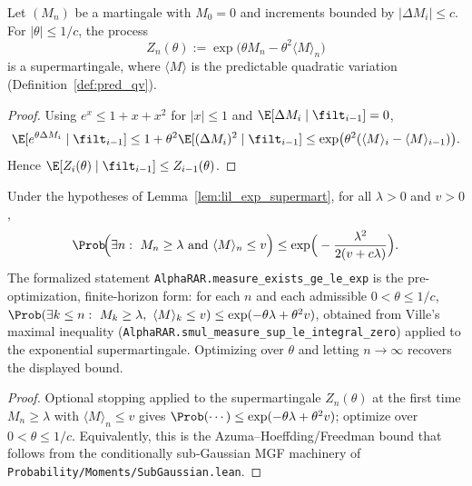 \begin{lemma}\label{lem:lil_exp_supermart}
\leanok
Let $(M_n)$ be a martingale with $M_0=0$ and increments bounded by
$|\Delta M_i| \le c$. For $|\theta| \le 1/c$, the process
\[
  Z_n(\theta) := \exp\!\Big(\theta M_n - \theta^2 \langle M\rangle_n\Big)
\]
is a supermartingale, where $\langle M\rangle$ is the predictable quadratic
variation (Definition~\ref{def:pred_qv}).
\end{lemma}

\begin{proof}\leanok
{}
Using $e^x \le 1 + x + x^2$ for $|x| \le 1$ and $\E[\Delta M_i\mid\filt_{i-1}]=0$,
\[
  \E[e^{\theta\Delta M_i}\mid\filt_{i-1}]
  \le 1 + \theta^2\E[(\Delta M_i)^2\mid\filt_{i-1}]
  \le \exp\!\big(\theta^2(\langle M\rangle_i - \langle M\rangle_{i-1})\big).
\]
Hence $\E[Z_i(\theta)\mid\filt_{i-1}] \le Z_{i-1}(\theta)$.
\end{proof}

\begin{lemma}\label{lem:lil_freedman}
Under the hypotheses of Lemma~\ref{lem:lil_exp_supermart}, for all $\lambda > 0$
and $v > 0$,
\[
  \Prob\!\Big(\exists n:\ M_n \ge \lambda \ \text{and}\ \langle M\rangle_n \le v\Big)
  \le \exp\!\Big(-\frac{\lambda^2}{2(v + c\lambda)}\Big).
\]
The formalized statement \texttt{AlphaRAR.measure\_exists\_ge\_le\_exp} is the pre-optimization,
finite-horizon form: for each $n$ and each admissible $0<\theta\le 1/c$,
$\Prob(\exists k\le n:\ M_k\ge\lambda,\ \langle M\rangle_k\le v)\le \exp(-\theta\lambda+\theta^2 v)$,
obtained from Ville's maximal inequality
(\texttt{AlphaRAR.smul\_measure\_sup\_le\_integral\_zero}) applied to the exponential
supermartingale. Optimizing over $\theta$ and letting $n\to\infty$ recovers the displayed bound.
\end{lemma}

\begin{proof}
Optional stopping applied to the supermartingale $Z_n(\theta)$ at the first time
$M_n\ge\lambda$ with $\langle M\rangle_n\le v$ gives
$\Prob(\cdots)\le \exp(-\theta\lambda + \theta^2 v)$; optimize over
$0<\theta\le 1/c$. Equivalently, this is the Azuma--Hoeffding/Freedman bound that
follows from the conditionally sub-Gaussian MGF machinery of
\texttt{Probability/Moments/SubGaussian.lean}.
\end{proof}

